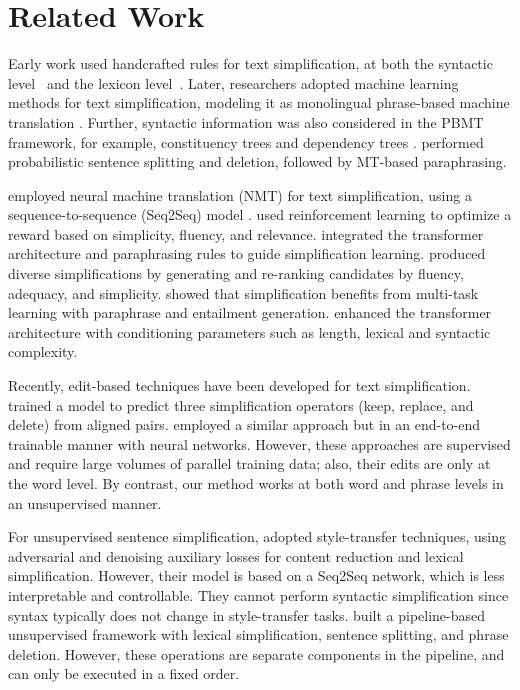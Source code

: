 \documentclass[11pt,a4paper]{article}
\begin{document}
\section{Related Work}



Early work used handcrafted rules for text simplification, at both the syntactic level~\cite{siddharthan2002architecture} and the lexicon level~\cite{carroll1999simplifying}. Later, researchers adopted machine learning methods for text simplification, modeling it as monolingual phrase-based machine translation \cite{wubben2012sentence, xu-etal-2016-optimizing}. Further, syntactic information was also considered in the PBMT framework, for example, constituency trees \cite{zhu2010monolingual} and dependency trees \cite{bingel2016text}. 
 performed probabilistic sentence splitting and deletion, followed by MT-based paraphrasing.





 employed neural machine translation (NMT) for text simplification, using a sequence-to-sequence (Seq2Seq) model \cite{sutskever2014sequence}.  used reinforcement learning to optimize a reward based on simplicity, fluency, and relevance.
 integrated the transformer architecture and paraphrasing rules to guide simplification learning.
 produced diverse simplifications by generating and re-ranking candidates by fluency, adequacy, and simplicity.  showed that simplification benefits from multi-task learning with paraphrase and entailment generation.  enhanced the transformer architecture with conditioning parameters such as length, lexical and syntactic complexity.

Recently, edit-based techniques have been developed for text simplification.  trained a model to predict three simplification operators (keep, replace, and delete) from aligned pairs.  employed a similar approach but in an end-to-end trainable manner with neural networks. 
However, these approaches are supervised and require large volumes of parallel training data; also, their edits are only at the word level. By contrast, our method works at both word and phrase levels in an unsupervised manner. 

For unsupervised sentence simplification,  adopted style-transfer techniques, using adversarial and denoising auxiliary losses for content reduction and lexical simplification. However, their model is based on a Seq2Seq network, which is less interpretable and controllable. They cannot perform syntactic simplification since syntax typically does not change in style-transfer tasks.  built a pipeline-based unsupervised framework with lexical simplification, sentence splitting, and phrase deletion. However, these operations are separate components in the pipeline, and can only be executed in a fixed order.
\end{document}
